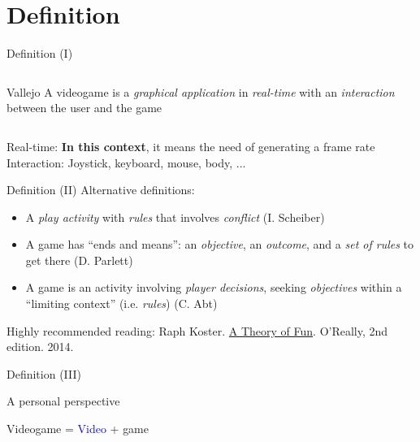\documentclass[10pt,compress]{beamer} %
\begin{document}
\section[Definition]{Definition}
\begin{frame}{Definition (I)}
    \begin{columns}
	   \begin{block}{Vallejo}
	   A videogame is a \textit{graphical application} in \textit{real-time} with an \textit{interaction} between the user and the game
	   \end{block}
	\end{columns}
	\bigskip
	Real-time: \textbf{In this context}, it means the need of generating a frame rate\\
	Interaction: Joystick, keyboard, mouse, body, ...
\end{frame}

\begin{frame}{Definition (II)}
	Alternative definitions:

  	\begin{itemize}
	\item A \textit{play activity} with \textit{rules} that involves \textit{conflict} (I. Scheiber)
	\item A game has ``ends and means'': an \textit{objective}, an \textit{outcome}, and a \textit{set of rules} to get there (D. Parlett)
	\item A game is an activity involving \textit{player decisions}, seeking \textit{objectives} within a ``limiting context'' (i.e. \textit{rules}) (C. Abt)
	\end{itemize}
	Highly recommended reading: Raph Koster. \href{http://www.theoryoffun.com/theoryoffun.pdf}{A Theory of Fun}. O'Really, 2nd edition. 2014.
\end{frame}

\begin{frame}{Definition (III)}
	\begin{center}
	A personal perspective
	\end{center}

	\begin{center}
	\huge Videogame = \textcolor{blue}{Video} + \alert{game}
	\end{center}

\end{frame}
\end{document}
